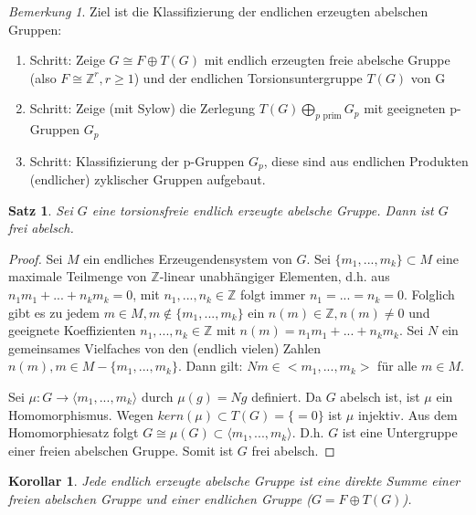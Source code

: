 \documentclass[12pt]{scrartcl} %
\newtheorem{thm}{Satz}
\newtheorem{kor}{Korollar}
\theoremstyle{definition}
\theoremstyle{remark}
\newtheorem*{nb}{Bemerkung}
\begin{document}

\begin{nb}
Ziel ist die Klassifizierung der endlichen erzeugten abelschen Gruppen:
\begin{enumerate}
\item Schritt: Zeige $G \cong F \oplus T(G)$ mit endlich erzeugten freie abelsche Gruppe (also $F \cong \mathbb{Z}^{r}, r \geq 1$) und der endlichen Torsionsuntergruppe $T(G)$ von G
\item Schritt: Zeige (mit Sylow) die Zerlegung $T(G) \bigoplus_{p\text{ prim}} G_{p}$ mit geeigneten p-Gruppen $G_{p}$
\item Schritt: Klassifizierung der p-Gruppen $G_{p}$, diese sind aus endlichen Produkten (endlicher) zyklischer Gruppen aufgebaut.
\end{enumerate}
\end{nb}

\begin{thm}
Sei $G$ eine torsionsfreie endlich erzeugte abelsche Gruppe. Dann ist $G$ frei abelsch.
\end{thm}

\begin{proof}
Sei $M$ ein endliches Erzeugendensystem von $G$. 
Sei $\{m_{1},...,m_{k}\} \subset M$ eine maximale Teilmenge von $\mathbb{Z}$-linear unabhängiger Elementen, d.h. aus $n_{1}m_{1}+...+n_{k}m_{k}=0$, mit $n_{1},...,n_{k} \in \mathbb{Z}$ folgt immer $n_{1}=...=n_{k}=0$. 
Folglich gibt es zu jedem $m \in M, m \notin \{m_{1},...,m_{k}\}$ ein $n(m) \in \mathbb{Z}, n(m)\neq 0$ und geeignete Koeffizienten $n_{1},...,n_{k} \in \mathbb{Z}$ mit $n(m)=n_{1}m_{1}+...+n_{k}m_{k}$. 
Sei $N$ ein gemeinsames Vielfaches von den (endlich vielen) Zahlen $n(m),m \in M-\{m_{1},...,m_{k}\}$. 
Dann gilt: $Nm \in <m_{1},...,m_{k}>$ für alle $m \in M$.

Sei $\mu :G\rightarrow \langle m_{1},...,m_{k} \rangle $ durch $\mu (g)=Ng$ definiert. Da $G$ abelsch ist, ist $\mu$ ein Homomorphismus. Wegen $kern(\mu ) \subset T(G) = \{= 0\}$ ist $\mu$ injektiv. Aus dem Homomorphiesatz folgt $G \cong \mu (G) \subset \langle m_{1},...,m_{k}\rangle$. D.h. $G$ ist eine Untergruppe einer freien abelschen Gruppe. Somit ist $G$ frei abelsch.
\end{proof}

\begin{kor}
Jede endlich erzeugte abelsche Gruppe ist eine direkte Summe einer freien abelschen Gruppe und einer endlichen Gruppe ($G=F\oplus T(G)$).
\end{kor}
\end{document}
